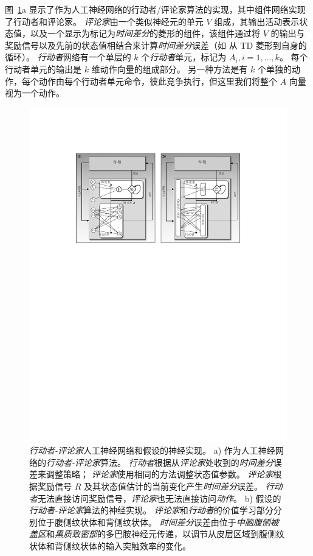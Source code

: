 图~\ref{fig:12_6}a 显示了作为人工神经网络的行动者/评论家算法的实现，其中组件网络实现了行动者和评论家。
\textit{评论家}由一个类似神经元的单元 $V$ 组成，其输出活动表示状态值，以及一个显示为标记为\textit{时间差分}的菱形的组件，该组件通过将 $V$ 的输出与奖励信号以及先前的状态值相结合来计算\textit{时间差分}误差（如 从 TD 菱形到自身的循环）。
\textit{行动者}网络有一个单层的 $k$ 个\textit{行动者}单元，标记为 $A_i, i=1,...,k$。
每个行动者单元的输出是 $k$ 维动作向量的组成部分。 
另一种方法是有 $k$ 个单独的动作，每个动作由每个行动者单元命令，彼此竞争执行，但这里我们将整个 $A$ 向量视为一个动作。


\begin{figure}[!htb]
	\centering
	\includegraphics[width=0.8\linewidth]{chap12/fig_12_6}
	\caption{\textit{行动者-评论家}人工神经网络和假设的神经实现。
		a) 作为人工神经网络的\textit{行动者-评论家}算法。
			\textit{行动者}根据从\textit{评论家}处收到的\textit{时间差分}误差来调整策略；
			\textit{评论家}使用相同的方法调整状态值参数。
			\textit{评论家}根据奖励信号 $R$ 及其状态值估计的当前变化产生\textit{时间差分}误差。
			\textit{行动者}无法直接访问奖励信号，\textit{评论家}也无法直接访问\textit{动作}。
			b) 假设的\textit{行动者-评论家}算法的神经实现。
			\textit{评论家}和\textit{行动者}的价值学习部分分别位于腹侧纹状体和背侧纹状体。
			\textit{时间差分}误差由位于\textit{中脑腹侧被盖区}和\textit{黑质致密部}的多巴胺神经元传递，以调节从皮层区域到腹侧纹状体和背侧纹状体的输入突触效率的变化\cite{takahashi2008silencing}。
		\label{fig:12_6}}
\end{figure}


